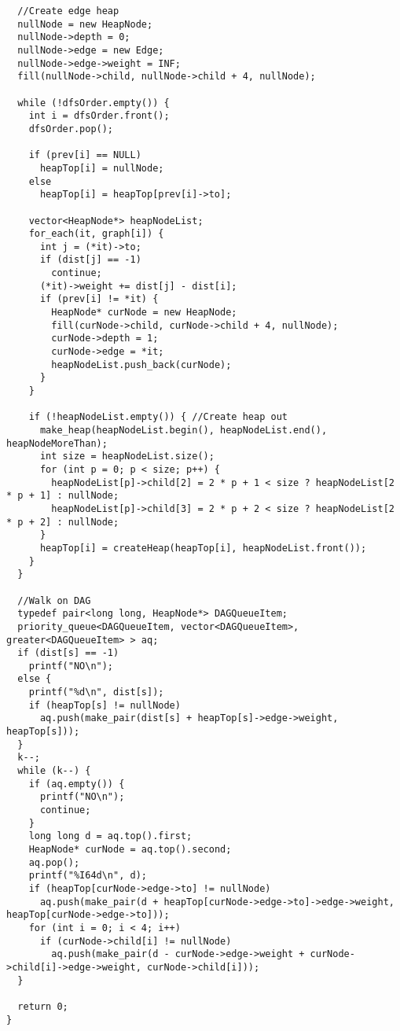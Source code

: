 \begin{lstlisting}
  //Create edge heap
  nullNode = new HeapNode;
  nullNode->depth = 0;
  nullNode->edge = new Edge;
  nullNode->edge->weight = INF;
  fill(nullNode->child, nullNode->child + 4, nullNode);

  while (!dfsOrder.empty()) {
    int i = dfsOrder.front();
    dfsOrder.pop();

    if (prev[i] == NULL)
      heapTop[i] = nullNode;
    else
      heapTop[i] = heapTop[prev[i]->to];

    vector<HeapNode*> heapNodeList;
    for_each(it, graph[i]) {
      int j = (*it)->to;
      if (dist[j] == -1)
        continue;
      (*it)->weight += dist[j] - dist[i];
      if (prev[i] != *it) {
        HeapNode* curNode = new HeapNode;
        fill(curNode->child, curNode->child + 4, nullNode);
        curNode->depth = 1;
        curNode->edge = *it;
        heapNodeList.push_back(curNode);
      }
    }

    if (!heapNodeList.empty()) { //Create heap out
      make_heap(heapNodeList.begin(), heapNodeList.end(), heapNodeMoreThan);
      int size = heapNodeList.size();
      for (int p = 0; p < size; p++) {
        heapNodeList[p]->child[2] = 2 * p + 1 < size ? heapNodeList[2 * p + 1] : nullNode;
        heapNodeList[p]->child[3] = 2 * p + 2 < size ? heapNodeList[2 * p + 2] : nullNode;
      }
      heapTop[i] = createHeap(heapTop[i], heapNodeList.front());
    }
  }

  //Walk on DAG
  typedef pair<long long, HeapNode*> DAGQueueItem;
  priority_queue<DAGQueueItem, vector<DAGQueueItem>, greater<DAGQueueItem> > aq;
  if (dist[s] == -1)
    printf("NO\n");
  else {
    printf("%d\n", dist[s]);
    if (heapTop[s] != nullNode)
      aq.push(make_pair(dist[s] + heapTop[s]->edge->weight, heapTop[s]));
  }
  k--;
  while (k--) {
    if (aq.empty()) {
      printf("NO\n");
      continue;
    }
    long long d = aq.top().first;
    HeapNode* curNode = aq.top().second;
    aq.pop();
    printf("%I64d\n", d);
    if (heapTop[curNode->edge->to] != nullNode)
      aq.push(make_pair(d + heapTop[curNode->edge->to]->edge->weight, heapTop[curNode->edge->to]));
    for (int i = 0; i < 4; i++)
      if (curNode->child[i] != nullNode)
        aq.push(make_pair(d - curNode->edge->weight + curNode->child[i]->edge->weight, curNode->child[i]));
  }

  return 0;
}

\end{lstlisting}